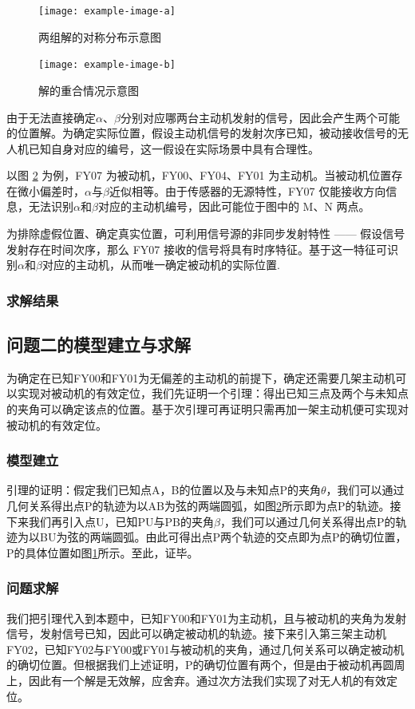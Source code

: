 \documentclass[withoutpreface,bwprint]{cumcmthesis} %
\begin{document}
\begin{figure}[htbp]
    \centering
    \texttt{[image: example-image-a]} 
    \caption{两组解的对称分布示意图}  
    \label{q1_3}    
\end{figure}

\begin{figure}[htbp]
    \centering
    \texttt{[image: example-image-b]} 
    \caption{解的重合情况示意图}
    \label{q1_4}   
\end{figure}

由于无法直接确定\(\alpha\)、\(\beta\)分别对应哪两台主动机发射的信号，因此会产生两个可能的位置解。为确定实际位置，假设主动机信号的发射次序已知，被动接收信号的无人机已知自身对应的编号，这一假设在实际场景中具有合理性。

以图 \ref{q1_4} 为例，FY07 为被动机，FY00、FY04、FY01 为主动机。当被动机位置存在微小偏差时，$\alpha$与$\beta$近似相等。由于传感器的无源特性，FY07 仅能接收方向信息，无法识别$\alpha$和$\beta$对应的主动机编号，因此可能位于图中的 M、N 两点。

为排除虚假位置、确定真实位置，可利用信号源的非同步发射特性 —— 假设信号发射存在时间次序，那么 FY07 接收的信号将具有时序特征。基于这一特征可识别$\alpha$和$\beta$对应的主动机，从而唯一确定被动机的实际位置.



\subsubsection{求解结果}




\subsection{问题二的模型建立与求解}
为确定在已知FY00和FY01为无偏差的主动机的前提下，确定还需要几架主动机可以实现对被动机的有效定位，我们先证明一个引理：得出已知三点及两个与未知点的夹角可以确定该点的位置。基于次引理可再证明只需再加一架主动机便可实现对被动机的有效定位。
\subsubsection{模型建立}
引理的证明：假定我们已知点A，B的位置以及与未知点P的夹角$\theta$，我们可以通过几何关系得出点P的轨迹为以AB为弦的两端圆弧，如图\ref{q1_4}所示即为点P的轨迹。接下来我们再引入点U，已知PU与PB的夹角$\beta$，我们可以通过几何关系得出点P的轨迹为以BU为弦的两端圆弧。由此可得出点P两个轨迹的交点即为点P的确切位置，P的具体位置如图\ref{q1_3}所示。至此，证毕。
\subsubsection{问题求解}
我们把引理代入到本题中，已知FY00和FY01为主动机，且与被动机的夹角为发射信号，发射信号已知，因此可以确定被动机的轨迹。接下来引入第三架主动机FY02，已知FY02与FY00或FY01与被动机的夹角，通过几何关系可以确定被动机的确切位置。但根据我们上述证明，P的确切位置有两个，但是由于被动机再圆周上，因此有一个解是无效解，应舍弃。通过次方法我们实现了对无人机的有效定位。
\end{document}

